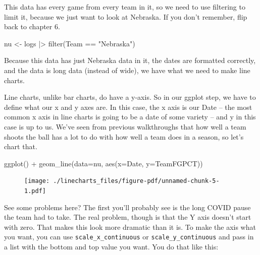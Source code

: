 \documentclass[
  letterpaper,
  DIV=11,
  numbers=noendperiod]{scrreprt}
\newenvironment{Shaded}{\begin{snugshade}}{\end{snugshade}}
\newcommand{\AttributeTok}[1]{\textcolor[rgb]{0.40,0.45,0.13}{#1}}
\newcommand{\FunctionTok}[1]{\textcolor[rgb]{0.28,0.35,0.67}{#1}}
\newcommand{\NormalTok}[1]{\textcolor[rgb]{0.00,0.23,0.31}{#1}}
\newcommand{\OtherTok}[1]{\textcolor[rgb]{0.00,0.23,0.31}{#1}}
\newcommand{\SpecialCharTok}[1]{\textcolor[rgb]{0.37,0.37,0.37}{#1}}
\newcommand{\StringTok}[1]{\textcolor[rgb]{0.13,0.47,0.30}{#1}}
\begin{document}
This data has every game from every team in it, so we need to use
filtering to limit it, because we just want to look at Nebraska. If you
don't remember, flip back to chapter 6.

\begin{Shaded}
\begin{Highlighting}[]
\NormalTok{nu }\OtherTok{\textless{}{-}}\NormalTok{ logs }\SpecialCharTok{|\textgreater{}} \FunctionTok{filter}\NormalTok{(Team }\SpecialCharTok{==} \StringTok{"Nebraska"}\NormalTok{)}
\end{Highlighting}
\end{Shaded}

Because this data has just Nebraska data in it, the dates are formatted
correctly, and the data is long data (instead of wide), we have what we
need to make line charts.

Line charts, unlike bar charts, do have a y-axis. So in our ggplot step,
we have to define what our x and y axes are. In this case, the x axis is
our Date -- the most common x axis in line charts is going to be a date
of some variety -- and y in this case is up to us. We've seen from
previous walkthroughs that how well a team shoots the ball has a lot to
do with how well a team does in a season, so let's chart that.

\begin{Shaded}
\begin{Highlighting}[]
\FunctionTok{ggplot}\NormalTok{() }\SpecialCharTok{+} \FunctionTok{geom\_line}\NormalTok{(}\AttributeTok{data=}\NormalTok{nu, }\FunctionTok{aes}\NormalTok{(}\AttributeTok{x=}\NormalTok{Date, }\AttributeTok{y=}\NormalTok{TeamFGPCT))}
\end{Highlighting}
\end{Shaded}

\begin{figure}[H]

{\centering \texttt{[image: ./linecharts\_files/figure-pdf/unnamed-chunk-5-1.pdf]}

}

\end{figure}

See some problems here? The first you'll probably see is the long COVID
pause the team had to take. The real problem, though is that the Y axis
doesn't start with zero. That makes this look more dramatic than it is.
To make the axis what you want, you can use
\texttt{scale\_x\_continuous} or \texttt{scale\_y\_continuous} and pass
in a list with the bottom and top value you want. You do that like this:
\end{document}
